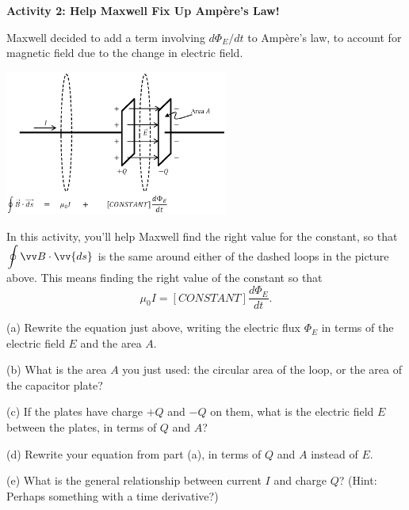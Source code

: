 \pagebreak
\textbf{Activity 2: Help Maxwell Fix Up Amp\`ere's Law!}

Maxwell decided to add a term involving $d\Phi_E/dt$ to Amp\`ere's law, to account for magnetic field due to the change in electric field.
\begin{center}
\vspace{-0.2in}
    \includegraphics[width=0.55\textwidth]{deriving_em_waves/two_loops_with_equation.eps}
\vspace{-0.1in}
\end{center}

In this activity, you'll help Maxwell find the right value for the constant, so that $\displaystyle \oint \vv B \cdot \vv{ds}$ is the same around either of the dashed loops in the picture above.  This means finding the right value of the constant so that
\begin{displaymath}
\mu_0I = [CONSTANT] \frac{d\Phi_E}{dt}.
\end{displaymath}

\vspace{-0.1in}
(a) Rewrite the equation just above, writing the electric flux $\Phi_E$ in terms of the electric field $E$ and the area $A$.
\vspace{0.4in}

(b) What is the area $A$ you just used: the circular area of the loop, or the area of the capacitor plate?
\vspace{0.3in}

(c) If the plates have charge $+Q$ and $-Q$ on them, what is the electric field $E$ between the plates, in terms of $Q$ and $A$?
\vspace{0.6in}

(d) Rewrite your equation from part (a), in terms of $Q$ and $A$ instead of $E$.
\vspace{0.5in}

(e) What is the general relationship between current $I$ and charge $Q$? (Hint: Perhaps something with a time derivative?)
\vspace{0.3in}

